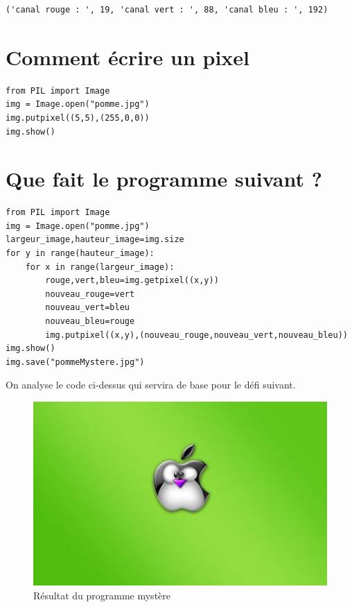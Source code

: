 \documentclass[11pt]{article}
\begin{document}
\begin{verbatim}
('canal rouge : ', 19, 'canal vert : ', 88, 'canal bleu : ', 192)
\end{verbatim}


\section{Comment écrire un pixel}
\label{sec:orga4d1006}

\begin{verbatim}
from PIL import Image
img = Image.open("pomme.jpg")
img.putpixel((5,5),(255,0,0))
img.show()
\end{verbatim}


\section{Que fait le programme suivant ?}
\label{sec:orgc0550a4}

\begin{verbatim}
from PIL import Image
img = Image.open("pomme.jpg")
largeur_image,hauteur_image=img.size
for y in range(hauteur_image):
    for x in range(largeur_image):
        rouge,vert,bleu=img.getpixel((x,y))
        nouveau_rouge=vert
        nouveau_vert=bleu
        nouveau_bleu=rouge
        img.putpixel((x,y),(nouveau_rouge,nouveau_vert,nouveau_bleu))
img.show()
img.save("pommeMystere.jpg")
\end{verbatim}


On analyse le code ci-dessus qui servira de base pour le défi suivant.

\begin{figure}[htbp]
\centering
\includegraphics[width=.9\linewidth]{pommeMystere.jpg}
\caption{Résultat du programme mystère}
\end{figure}
\end{document}
